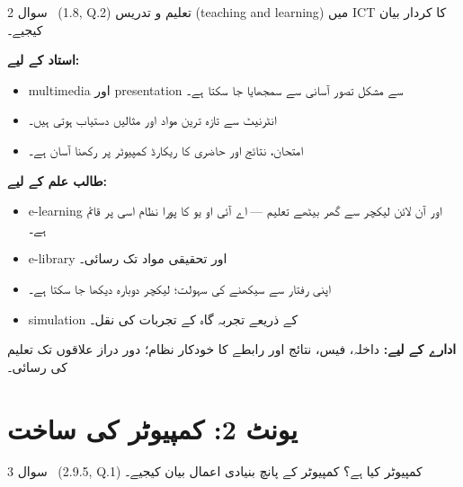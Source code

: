 \begin{sawal}{سوال \textenglish{2} \ \textnormal{\small(\textenglish{1.8, Q.2})}}
تعلیم و تدریس (\textenglish{teaching and learning}) میں \textenglish{ICT} کا
کردار بیان کیجیے۔
\end{sawal}

\begin{hal}
\textbf{استاد کے لیے:}
\begin{itemize}\setlength{\itemsep}{1pt}
  \item \textenglish{multimedia} اور \textenglish{presentation} سے مشکل تصور
        آسانی سے سمجھایا جا سکتا ہے۔
  \item انٹرنیٹ سے تازہ ترین مواد اور مثالیں دستیاب ہوتی ہیں۔
  \item امتحان، نتائج اور حاضری کا ریکارڈ کمپیوٹر پر رکھنا آسان ہے۔
\end{itemize}

\textbf{طالب علم کے لیے:}
\begin{itemize}\setlength{\itemsep}{1pt}
  \item \textenglish{e-learning} اور آن لائن لیکچر سے گھر بیٹھے تعلیم ---
        اے آئی او یو کا پورا نظام اسی پر قائم ہے۔
  \item \textenglish{e-library} اور تحقیقی مواد تک رسائی۔
  \item اپنی رفتار سے سیکھنے کی سہولت؛ لیکچر دوبارہ دیکھا جا سکتا ہے۔
  \item \textenglish{simulation} کے ذریعے تجربہ گاہ کے تجربات کی نقل۔
\end{itemize}

\textbf{ادارے کے لیے:} داخلہ، فیس، نتائج اور رابطے کا خودکار نظام؛ دور دراز
علاقوں تک تعلیم کی رسائی۔

\end{hal}

\section*{یونٹ \textenglish{2}: کمپیوٹر کی ساخت}

\begin{sawal}{سوال \textenglish{3} \ \textnormal{\small(\textenglish{2.9.5, Q.1})}}
کمپیوٹر کیا ہے؟ کمپیوٹر کے پانچ بنیادی اعمال بیان کیجیے۔
\end{sawal}

